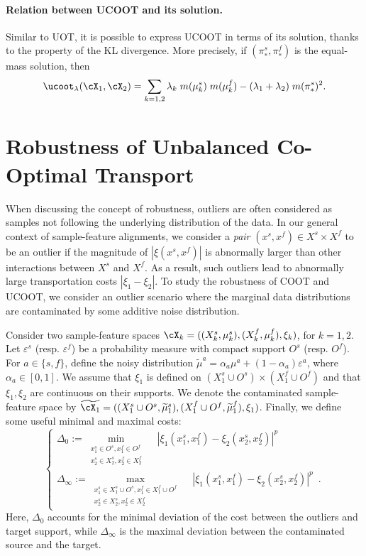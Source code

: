 \paragraph{Relation between UCOOT and its solution.} Similar to UOT,
it is possible to express UCOOT in terms of its solution, thanks to the property of the
KL divergence. More precisely, if $(\pi_*^s, \pi_*^f)$ is the equal-mass solution, then
\begin{align}
  \ucoot_{\lambda}(\cX_1, \cX_2) =
  \sum_{k=1, 2} \lambda_k \; m(\mu_k^s) \; m(\mu_k^f) - (\lambda_1  + \lambda_2) \; m(\pi^s_*)^2.
\end{align}

\section{Robustness of Unbalanced Co-Optimal Transport} \label{sec:robustness}
When discussing the concept of robustness, outliers are often considered as samples
not following the underlying distribution of the data. In our general context of
sample-feature alignments, we consider a \emph{pair} $(x^s, x^f) \in X^s \times X^f$
to be an outlier if the magnitude of $|\xi(x^s, x^f)|$ is abnormally larger than
other interactions between $X^s$ and $X^f$. As a result, such outliers lead to
abnormally large transportation costs $|\xi_1 - \xi_2|$. To study the robustness of COOT and UCOOT,
we consider an outlier scenario where the marginal data distributions are contaminated
by some additive noise distribution.
\begin{assumption}
\label{assump:robust}
Consider two sample-feature spaces
$\cX_k = ((X^s_k, \mu^s_k), (X^f_k, \mu^f_k), \xi_k)$, for $k=1,2$.
Let $\varepsilon^s$ (resp. $\varepsilon^f$) be a probability measure with
compact support $O^s$ (resp. $O^f$). For $a \in \{s, f\}$,
define the noisy distribution $\widetilde{\mu}^a = \alpha_a \mu^a + (1-\alpha_a) \varepsilon^a$,
where $\alpha_a \in [0,1]$. We assume that $\xi_1$ is defined on
$(X^s_1 \cup O^s) \times (X^f_1 \cup O^f)$ and
that $\xi_1, \xi_2$ are continuous on their supports.
We denote the contaminated sample-feature space by
$\widetilde{\cX_1} = ((X^s_1 \cup O^s, \widetilde{\mu}^s_1), (X^f_1 \cup O^f, \widetilde{\mu}^f_1), \xi_1)$.
Finally, we define some useful minimal and maximal costs:
  \begin{equation}
    \begin{cases}
  \Delta_{0} := \min\limits_{
  \substack{
       x_1^s \in O^s, x_1^f \in O^f  \\
       x_2^s \in X_2^s, x_2^f \in X_2^f
  }}\quad |\xi_1(x_1^s, x_1^f) - \xi_2(x_2^s, x_2^f)|^p \\
  \Delta_{\infty} := \max\limits_{
  \substack{
  x_1^s \in X_1^s \cup O^s, x_1^f \in X_1^f \cup O^f \\
  x_2^s \in X_2^s, x_2^f \in X_2^f
  }} \quad|\xi_1(x_1^s, x_1^f) - \xi_2(x_2^s, x_2^f)|^p \enspace.
  \end{cases}
  \end{equation}
Here, $\Delta_{0}$ accounts for the minimal deviation of the cost between
the outliers and target support, while $\Delta_{\infty}$ is the maximal deviation
between the contaminated source and the target.
\end{assumption}
